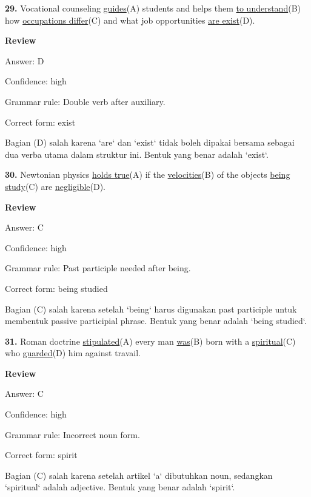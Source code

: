 \documentclass[12pt]{article}
\begin{document}
\endgroup
\par
\vspace{\questionblockgap}
\noindent\textbf{29.} Vocational counseling \uline{guides}(A) students and helps them \uline{to understand}(B) how \uline{occupations differ}(C) and what job opportunities \uline{are exist}(D).
\par
\begingroup
\setlength{\parskip}{0pt}
\setlength{\parindent}{0pt}
\textbf{Review}\par
Answer: D\par
Confidence: high\par
Grammar rule: Double verb after auxiliary.\par
Correct form: exist\par
Bagian (D) salah karena `are` dan `exist` tidak boleh dipakai bersama sebagai dua verba utama dalam struktur ini. Bentuk yang benar adalah `exist`.\par
\endgroup
\par
\vspace{\questionblockgap}
\noindent\textbf{30.} Newtonian physics \uline{holds true}(A) if the \uline{velocities}(B) of the objects \uline{being study}(C) are \uline{negligible}(D).
\par
\begingroup
\setlength{\parskip}{0pt}
\setlength{\parindent}{0pt}
\textbf{Review}\par
Answer: C\par
Confidence: high\par
Grammar rule: Past participle needed after being.\par
Correct form: being studied\par
Bagian (C) salah karena setelah `being` harus digunakan past participle untuk membentuk passive participial phrase. Bentuk yang benar adalah `being studied`.\par
\endgroup
\par
\vspace{\questionblockgap}
\noindent\textbf{31.} Roman doctrine \uline{stipulated}(A) every man \uline{was}(B) born with a \uline{spiritual}(C) who \uline{guarded}(D) him against travail.
\par
\begingroup
\setlength{\parskip}{0pt}
\setlength{\parindent}{0pt}
\textbf{Review}\par
Answer: C\par
Confidence: high\par
Grammar rule: Incorrect noun form.\par
Correct form: spirit\par
Bagian (C) salah karena setelah artikel `a` dibutuhkan noun, sedangkan `spiritual` adalah adjective. Bentuk yang benar adalah `spirit`.\par
\end{document}
